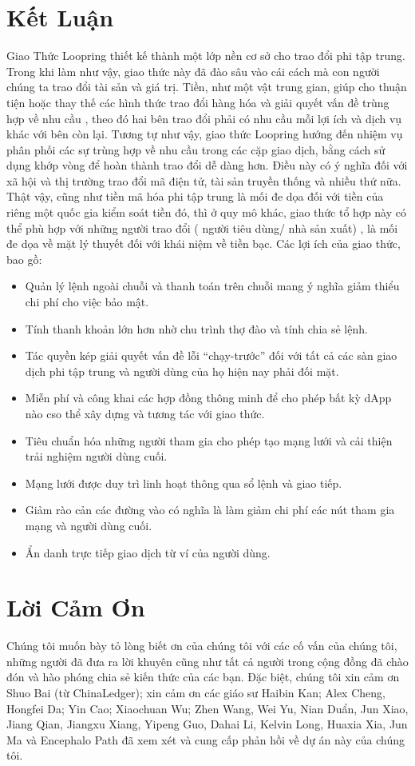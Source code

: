 \documentclass{article}
\begin{document}
\begin{multicols}{2}
\section{Kết Luận}
Giao Thức Loopring thiết kế thành một lớp nền cơ sở cho trao đổi phi tập trung. Trong khi làm như vậy, giao thức này đã đào sâu vào cái cách mà con người chúng ta trao đổi tài sản và giá trị. Tiền, như một vật trung gian, giúp cho thuận tiện hoặc thay thế các hình thức trao đổi hàng hóa và giải quyết vấn đề trùng hợp về nhu cầu \cite{unenumerated2006}, theo đó hai bên trao đổi phải có nhu cầu mỗi lợi ích và dịch vụ khác với bên còn lại. Tương tự như vậy, giao thức Loopring hướng đến nhiệm vụ phân phối các sự trùng hợp về nhu cầu trong các cặp giao dịch, bằng cách sử dụng khớp vòng để hoàn thành trao đổi dễ dàng hơn. Điều này có ý nghĩa đối với xã hội và thị trường trao đổi mã điện tử, tài sản truyền thống và nhiều thứ nữa. Thật vậy, cũng như tiền mã hóa phi tập trung là mối đe dọa đối với tiền của riêng một quốc gia kiểm soát tiền đó, thì ở quy mô khác,  giao thức tổ hợp này có thể phù hợp với những người trao đổi ( người tiêu dùng/ nhà sản xuất) , là mối đe dọa về mặt lý thuyết đối với khái niệm về tiền bạc.
Các lợi ích của giao thức, bao gồ:
\begin{itemize}
	\item Quản lý lệnh ngoài chuỗi và thanh toán trên chuỗi mang ý nghĩa giảm thiểu chi phí cho việc bảo mật.
	\item Tính thanh khoản lớn hơn nhờ chu trình thợ đào và tính chia sẻ lệnh.
	\item Tác quyền kép giải quyết vấn đề lỗi “chạy-trước” đối với tất cả các sàn giao dịch phi tập trung và người dùng của họ hiện nay phải đối mặt.
	\item Miễn phí và công khai các hợp đồng thông minh để cho phép bất kỳ dApp nào cso thể xây dựng và tương tác với giao thức.
	\item Tiêu chuẩn hóa những người tham gia cho phép tạo mạng lưới và cải thiện trải nghiệm người dùng cuối.
	\item Mạng lưới được duy trì linh hoạt thông qua sổ lệnh và giao tiếp.
	\item Giảm rào cản các đường vào có nghĩa là làm giảm chi phí các nút tham gia mạng và người dùng cuối.
	\item Ẩn danh trực tiếp giao dịch từ ví của người dùng.
\end{itemize}
\section{Lời Cảm Ơn}
Chúng tôi muốn bày tỏ lòng biết ơn của chúng tôi với các cố vấn của chúng tôi, những người đã đưa ra lời khuyên cũng như tất cả người trong cộng đồng đã chào đón và hào phóng chia sẻ kiến thức của các bạn. Đặc biệt, chúng tôi xin cảm ơn Shuo Bai (từ ChinaLedger); xin cảm ơn các giáo sư Haibin Kan; Alex Cheng, Hongfei Da; Yin Cao; Xiaochuan Wu; Zhen Wang, Wei Yu, Nian Duẩn, Jun Xiao, Jiang Qian, Jiangxu Xiang, Yipeng Guo, Dahai Li, Kelvin Long, Huaxia Xia, Jun Ma và Encephalo Path đã xem xét và cung cấp phản hồi về dự án này của chúng tôi. 


\end{multicols}
\end{document}
